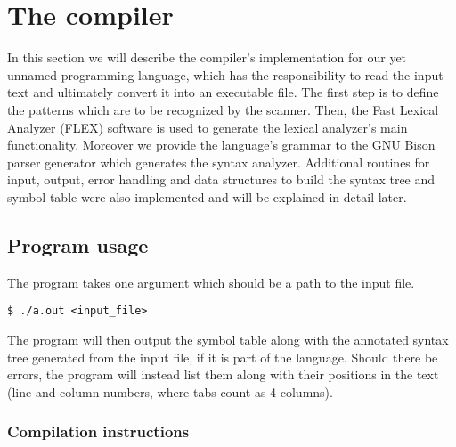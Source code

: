 \section{The compiler}
In this section we will describe the compiler's implementation for our yet unnamed programming
language, which has the responsibility to read the input text and ultimately convert it into an
executable file. The first step is to define the patterns which are to be recognized by the scanner.
Then, the Fast Lexical Analyzer (FLEX) \cite{FLEX} software is used to generate the lexical
analyzer's main functionality. Moreover we provide the language's grammar to the GNU Bison parser
generator \cite{BISON} which generates the syntax analyzer. Additional routines for input, output,
error handling and data structures to build the syntax tree and symbol table were also implemented
and will be explained in detail later.


\subsection{Program usage}
The program takes one argument which should be a path to the input file.

\begin{lstlisting}
$ ./a.out <input_file>
\end{lstlisting}

The program will then output the symbol table along with the
annotated syntax tree generated from the input file, if it is part of the language.
Should there be errors, the program will instead list them along with their
positions in the text (line and column numbers, where tabs count as 4 columns).

\subsubsection{Compilation instructions}

